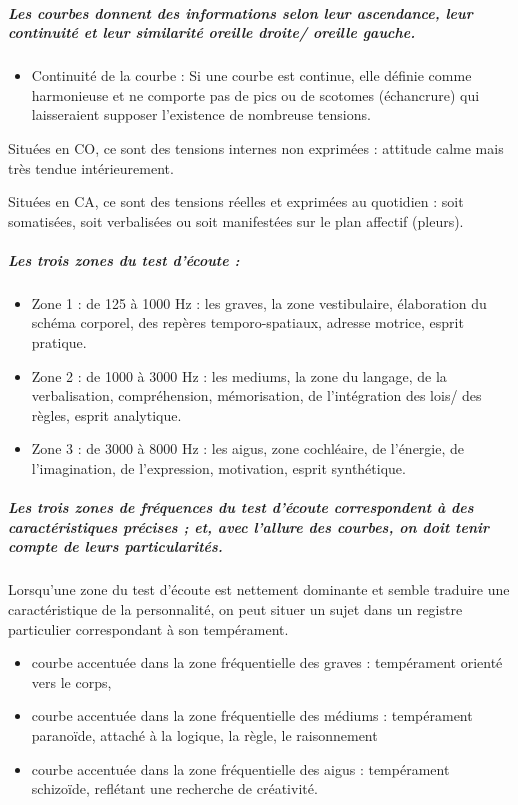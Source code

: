 \subparagraph{Les courbes donnent des informations selon leur ascendance, leur
continuité et leur similarité oreille droite/ oreille gauche.}
\begin{itemize}
\item Continuité de la courbe : Si une courbe est continue, elle définie
comme harmonieuse et ne comporte pas de pics ou de scotomes (échancrure)  qui laisseraient
supposer l'existence de nombreuse tensions.
\end{itemize}
Situées en CO, ce sont des tensions internes non exprimées : attitude
calme mais très tendue intérieurement.

Situées en CA, ce sont des tensions réelles et exprimées au quotidien
: soit somatisées, soit verbalisées ou soit manifestées sur le plan
affectif (pleurs).

\subparagraph{Les trois zones du test d'écoute : }
\begin{itemize}
\item Zone 1 : de 125 à 1000 Hz : les graves, la zone vestibulaire, élaboration
du schéma corporel, des repères temporo-spatiaux, adresse motrice,
esprit pratique.
\item Zone 2 : de 1000 à 3000 Hz : les mediums, la zone du langage, de la
verbalisation, compréhension, mémorisation, de l'intégration des lois/
des règles, esprit analytique.
\item Zone 3 : de 3000 à 8000 Hz : les aigus, zone cochléaire, de l'énergie,
de l'imagination, de l'expression, motivation, esprit synthétique.
\end{itemize}

\subparagraph{Les trois zones de fréquences du test d'écoute correspondent à des
caractéristiques précises ; et, avec l'allure des courbes, on doit
tenir compte de leurs particularités.}

Lorsqu'une zone du test d'écoute est nettement dominante et semble
traduire une caractéristique de la personnalité, on peut situer un
sujet dans un registre particulier correspondant à son tempérament.

\begin{itemize}
	\item courbe accentuée dans la zone fréquentielle des graves : tempérament
	orienté vers le corps,
	
	\item courbe accentuée dans la zone fréquentielle des médiums : tempérament
	paranoïde, attaché à la logique, la règle, le raisonnement 
	
	\item courbe accentuée dans la zone fréquentielle des aigus : tempérament
	schizoïde, reflétant une recherche de créativité. 
\end{itemize}



